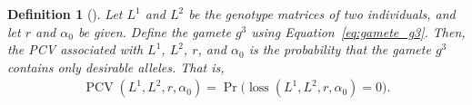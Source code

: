 \documentclass[12pt, a4paper, bibliography=totoc]{scrartcl}
\newtheorem{definition}{Definition}
\newcommand{\blue}{\textcolor{blue}}
\DeclareMathOperator*{\loss}{loss}
\DeclareMathOperator*{\PCV}{PCV}
\begin{document}
\begin{definition}[\cite{han2017predicted}]
\label{defn.PCV}
Let $L^1$ and $L^2$ be the genotype matrices of two individuals, and let $r$ and $\alpha_0$ be given. Define the gamete $g^3$ using Equation~\eqref{eq:gamete_g3}. Then, the PCV associated with $L^1$, $L^2$, $r$, and $\alpha_0$ is the probability that the gamete $g^3$ contains only desirable alleles.  That is,
\begin{align} \label{eq:PCV_with_loss}
    \PCV(L^1,L^2,r,\alpha_0) = \Pr\big(\loss(L^1,L^2,r,\alpha_0) = 0\big).
\end{align}
\end{definition}



\end{document}
